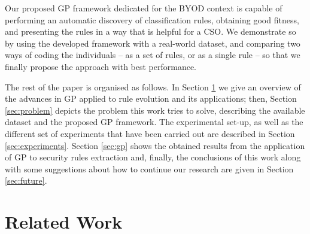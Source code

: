 \documentclass[a4paper,10pt,twocolumn,preprint,3p]{elsarticle}
\begin{document}
Our proposed GP framework dedicated
for the BYOD context is capable of performing an automatic discovery
of classification rules, obtaining good fitness, and presenting the rules in a way that is helpful for a CSO. We demonstrate so by using the developed framework with a real-world dataset, and comparing two ways of coding the individuals -- as a set of rules, or as a single rule -- so that we finally propose the approach with best performance. %

The rest of the paper is organised as follows. In Section \ref{sec:SotA} we give an overview of the advances in GP applied to rule evolution and its applications; then, Section \ref{sec:problem} depicts the problem this work tries to solve, describing the available dataset and the proposed GP framework. The experimental set-up, as well as the different set of experiments that have been carried out are described in Section \ref{sec:experiments}. Section \ref{sec:gp} shows the obtained results from the application of GP to security rules extraction and, finally, the conclusions of this work along with some suggestions about how to continue our research are given in Section \ref{sec:future}.  

\section{Related Work}
\label{sec:SotA}
\end{document}
